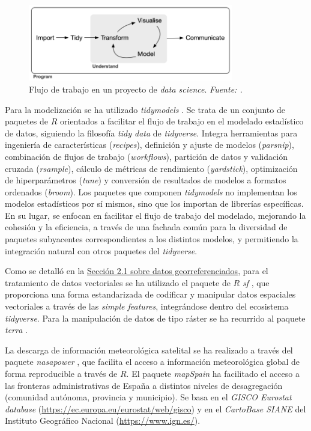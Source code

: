 \documentclass[12pt,a4paper,]{book}
\numberwithin{dummy}{section}
\theoremstyle{ocrenumbox}
\theoremstyle{blacknumex}
\theoremstyle{blacknumbox}
\theoremstyle{ocrenum}
\theoremstyle{ocrenum}
\begin{document}
\begin{figure}[H]
\centering
\includegraphics[width = 0.8\textwidth]{graficos/tidyverse_workflow.png}
\caption[Flujo de trabajo en un proyecto de \textit{data science}]{Flujo de trabajo en un proyecto de \textit{data science}. \it Fuente: \citet{tidyversepackage}.}
\label{fig:tidiverse_workflow}
\end{figure}

Para la modelización se ha utilizado \emph{tidymodels}
\citep{tidymodelspackage}. Se trata de un conjunto de paquetes de \(R\)
orientados a facilitar el flujo de trabajo en el modelado estadístico de
datos, siguiendo la filosofía \emph{tidy data} de \emph{tidyverse}.
Integra herramientas para ingeniería de características
(\emph{recipes}), definición y ajuste de modelos (\emph{parsnip}),
combinación de flujos de trabajo (\emph{workflows}), partición de datos
y validación cruzada (\emph{rsample}), cálculo de métricas de
rendimiento (\emph{yardstick}), optimización de hiperparámetros
(\emph{tune}) y conversión de resultados de modelos a formatos ordenados
(\emph{broom}). Los paquetes que componen \emph{tidymodels} no
implementan los modelos estadísticos por sí mismos, sino que los
importan de librerías específicas. En su lugar, se enfocan en facilitar
el flujo de trabajo del modelado, mejorando la cohesión y la eficiencia,
a través de una fachada común para la diversidad de paquetes subyacentes
correspondientes a los distintos modelos, y permitiendo la integración
natural con otros paquetes del \emph{tidyverse}.

Como se detalló en la
\protect\hyperlink{datos-georreferenciados}{Sección 2.1 sobre datos
georreferenciados}, para el tratamiento de datos vectoriales se ha
utilizado el paquete de \(R\) \emph{sf} \citep{sfpackage}, que
proporciona una forma estandarizada de codificar y manipular datos
espaciales vectoriales a través de las \emph{simple features},
integrándose dentro del ecosistema \emph{tidyverse}. Para la
manipulación de datos de tipo ráster se ha recurrido al paquete
\emph{terra} \citep{terrapackage}.

La descarga de información meteorológica satelital se ha realizado a
través del paquete \emph{nasapower} \citep{nasapower}, que facilita el
acceso a información meteorológica global de forma reproducible a través
de \(R\). El paquete \emph{mapSpain}\citep{R-mapspain} ha facilitado el
acceso a las fronteras administrativas de España a distintos niveles de
desagregación (comunidad autónoma, provincia y municipio). Se basa en el
\emph{GISCO Eurostat database}
(\url{https://ec.europa.eu/eurostat/web/gisco}) y en el \emph{CartoBase
SIANE} del Instituto Geográfico Nacional (\url{https://www.ign.es/}).




%
\end{document}
